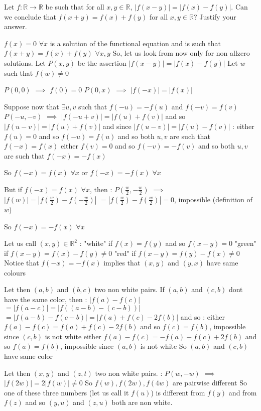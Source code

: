 \begin{solution}
	\begin{tcolorbox}Let $f:\mathbb{R}\rightarrow\mathbb{R}$ be such that for all $x,y\in\mathbb{R}$,
$\left|f(x-y)\right|=\left|f(x)-f(y)\right|$.
Can we conclude that 
$f(x+y)=f(x)+f(y)$
for all $x,y\in\mathbb{R}$? Justify your answer.\end{tcolorbox}
$f(x)=0$ $\forall x$ is a solution of the functional equation and is such that $f(x+y)=f(x)+f(y)$ $\forall x,y$
So, let us look from now only for non allzero solutions.
Let $P(x,y)$ be the assertion $|f(x-y)|=|f(x)-f(y)|$
Let $w$ such that $f(w)\ne 0$

$P(0,0)$ $\implies$ $f(0)=0$
$P(0,x)$ $\implies$ $|f(-x)|=|f(x)|$

Suppose now that $\exists u,v$ such that $f(-u)=-f(u)$ and $f(-v)=f(v)$
$P(-u,-v)$ $\implies$ $|f(-u+v)|=|f(u)+f(v)|$ and so $|f(u-v)|=|f(u)+f(v)|$ and since $|f(u-v)|=|f(u)-f(v)|$ :
either $f(u)=0$ and so $f(-u)=f(u)$ and so both $u,v$ are such that $f(-x)=f(x)$
either $f(v)=0$ and so $f(-v)=-f(v)$ and so both $u,v$ are such that $f(-x)=-f(x)$

So $f(-x)=f(x)$ $\forall x$ or $f(-x)=-f(x)$ $\forall x$

But if $f(-x)=f(x)$ $\forall x$, then : $P(\frac w2,-\frac w2)$ $\implies$ $|f(w)|=|f(\frac w2)-f(-\frac w2)|$ $=|f(\frac w2)-f(\frac w2)|=0$, impossible (definition of $w$)

So $f(-x)=-f(x)$ $\forall x$

Let us call $(x,y)\in\mathbb R^2$ :
"white" if $f(x)=f(y)$ and so $f(x-y)=0$
"green" if $f(x-y)=f(x)-f(y)\ne 0$
"red" if $f(x-y)=f(y)-f(x)\ne 0$
Notice that $f(-x)=-f(x)$ implies that $(x,y)$ and $(y,x)$ have same colours

Let then $(a,b)$ and $(b,c)$ two non white pairs.
If $(a,b)$ and $(c,b)$ dont have the same color, then :
$|f(a)-f(c)|$ $=|f(a-c)|=|f((a-b)-(c-b))|$ $=|f(a-b)-f(c-b)|=|f(a)+f(c)-2f(b)|$ and so :
either $f(a)-f(c)=f(a)+f(c)-2f(b)$ and so $f(c)=f(b)$, impossible since $(c,b)$ is not white
either $f(a)-f(c)=-f(a)-f(c)+2f(b)$ and so $f(a)=f(b)$, impossible since $(a,b)$ is not white
So $(a,b)$ and $(c,b)$ have same color


Let then $(x,y)$ and $(z,t)$ two non white pairs. :
$P(w,-w)$ $\implies$ $|f(2w)|=2|f(w)|\ne 0$ 
So $f(w),f(2w),f(4w)$ are pairwise different
So one of these three numbers (let us call it $f(u)$) is different from $f(y)$ and from $f(z)$ and so $(y,u)$ and $(z,u)$ both are non white.


\end{solution}
